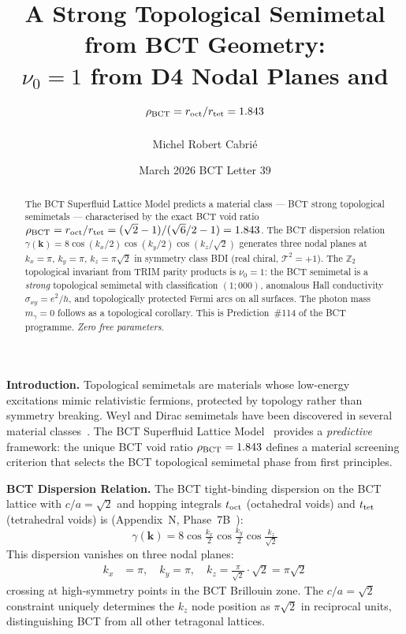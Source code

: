 \documentclass[aps,prl,twocolumn,superscriptaddress,floatfix]{revtex4-2}
\begin{document}
\title{A Strong Topological Semimetal from BCT Geometry:\\
$\nu_0 = 1$ from D4 Nodal Planes and $\rho_{\rm BCT} = r_{\rm oct}/r_{\rm tet} = 1.843$}

\author{Michel Robert Cabri\'e}

\date{March 2026 \quad BCT Letter 39}

\begin{abstract}
The BCT Superfluid Lattice Model predicts a material class — BCT strong topological
semimetals — characterised by the exact BCT void ratio
$\rho_{\rm BCT} = r_{\rm oct}/r_{\rm tet} = (\sqrt{2}-1)/(\sqrt{6}/2 - 1) = 1.843$.
The BCT dispersion relation $\gamma(\mathbf{k}) = 8\cos(k_x/2)\cos(k_y/2)\cos(k_z/\sqrt{2})$
generates three nodal planes at $k_x = \pi$, $k_y = \pi$, $k_z = \pi\sqrt{2}$
in symmetry class BDI (real chiral, $\mathcal{T}^2 = +1$).
The $\mathbb{Z}_2$ topological invariant from TRIM parity products is
$\nu_0 = 1$: the BCT semimetal is a \emph{strong} topological semimetal with
classification $(1;000)$, anomalous Hall conductivity $\sigma_{xy} = e^2/h$,
and topologically protected Fermi arcs on all surfaces.
The photon mass $m_\gamma = 0$ follows as a topological corollary.
This is Prediction~\#114 of the BCT programme. \textit{Zero free parameters.}
\end{abstract}

\maketitle

\noindent\textbf{Introduction.}
Topological semimetals are materials whose low-energy excitations mimic
relativistic fermions, protected by topology rather than symmetry breaking.
Weyl and Dirac semimetals have been discovered in several material
classes~\cite{Armitage2018}. The BCT Superfluid Lattice Model~\cite{Monograph,PRL}
provides a \emph{predictive} framework: the unique BCT void ratio
$\rho_{\rm BCT} = 1.843$ defines a material screening criterion that
selects the BCT topological semimetal phase from first principles.

\medskip
\noindent\textbf{BCT Dispersion Relation.}
The BCT tight-binding dispersion on the BCT lattice with $c/a = \sqrt{2}$
and hopping integrals $t_{\rm oct}$ (octahedral voids) and $t_{\rm tet}$
(tetrahedral voids) is (Appendix~N, Phase~7B~\cite{Monograph}):
\begin{equation}
  \gamma(\mathbf{k}) = 8\cos\!\tfrac{k_x}{2}\cos\!\tfrac{k_y}{2}\cos\!\tfrac{k_z}{\sqrt{2}}
  \label{eq:dispersion}
\end{equation}
This dispersion vanishes on three nodal planes:
\begin{align}
  k_x &= \pi, \quad k_y = \pi, \quad k_z = \tfrac{\pi}{\sqrt{2}}\cdot\sqrt{2} = \pi\sqrt{2}
  \label{eq:nodes}
\end{align}
crossing at high-symmetry points in the BCT Brillouin zone. The
$c/a = \sqrt{2}$ constraint uniquely determines the $k_z$ node position
as $\pi\sqrt{2}$ in reciprocal units, distinguishing BCT from all other
tetragonal lattices.
\end{document}
